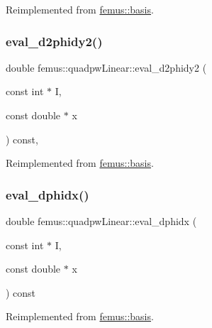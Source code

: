 Reimplemented from \mbox{\hyperlink{classfemus_1_1basis_ac9feaf9e60421143db2a3708f3c7fa48}{femus\+::basis}}.

\mbox{\label{classfemus_1_1quadpw_linear_a0600555381447b94613958383fe5f69f}} 
\subsubsection{\texorpdfstring{eval\+\_\+d2phidy2()}{eval\_d2phidy2()}}
{\footnotesize\ttfamily double femus\+::quadpw\+Linear\+::eval\+\_\+d2phidy2 (\begin{DoxyParamCaption}\item[{const int $\ast$}]{I,  }\item[{const double $\ast$}]{x }\end{DoxyParamCaption}) const\hspace{0.3cm}{\ttfamily [inline]}, {\ttfamily [virtual]}}



Reimplemented from \mbox{\hyperlink{classfemus_1_1basis_a0febb29fe4b32213ff8d6d428f7241cd}{femus\+::basis}}.

\mbox{\label{classfemus_1_1quadpw_linear_adb19c2091a0836195c299f901ac4bded}} 
\subsubsection{\texorpdfstring{eval\+\_\+dphidx()}{eval\_dphidx()}}
{\footnotesize\ttfamily double femus\+::quadpw\+Linear\+::eval\+\_\+dphidx (\begin{DoxyParamCaption}\item[{const int $\ast$}]{I,  }\item[{const double $\ast$}]{x }\end{DoxyParamCaption}) const\hspace{0.3cm}{\ttfamily [virtual]}}



Reimplemented from \mbox{\hyperlink{classfemus_1_1basis_a4db7d29cf8a753ddbccc4a297dafa0bf}{femus\+::basis}}.

